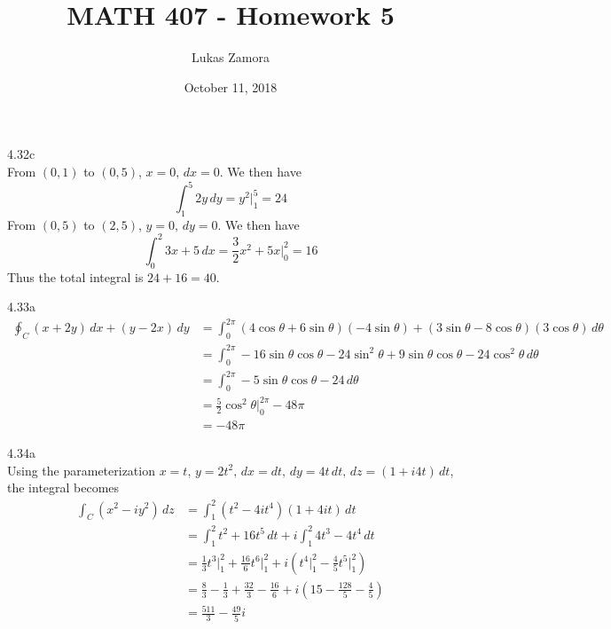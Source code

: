 \documentclass{article}
\title{MATH 407 - Homework 5}
\author{Lukas Zamora}
\date{October 11, 2018}
\theoremstyle{definition}
\begin{document}
    \maketitle
    
    \begin{prob}{4.32c} $  $ \vspace{2mm} \\ 
    	From $ (0,1) $ to $ (0,5) $, $ x=0, \, dx=0 $. We then have
    	\[
    		\int_{1}^{5} 2y \, dy = y^2 \Big|_{1}^{5} = 24
    	\]
    	From $ (0,5) $ to $ (2,5) $, $ y = 0, \, dy = 0 $. We then have
    	\[
    		\int_{0}^{2} 3x + 5 \, dx = \frac{3}{2}x^2 + 5x \Big|_{0}^{2} = 16 
    	\]
    	Thus the total integral is $ 24+16= \boxed{40} $.
    \end{prob}

	\begin{prob}{4.33a} $  $
		\begin{align*}
			\oint_C (x+2y)\,dx + (y-2x)\,dy &= \int_{0}^{2\pi} (4\cos\theta + 6\sin\theta)(-4\sin\theta) + (3\sin\theta - 8\cos\theta)(3\cos\theta) \, d\theta \\
			&= \int_{0}^{2\pi} -16\sin\theta\cos\theta - 24\sin^2\theta + 9\sin\theta\cos\theta - 24\cos^2\theta \, d\theta \\
			&= \int_{0}^{2\pi} -5\sin\theta\cos\theta - 24 \, d\theta \\
			&= \frac{5}{2}\cos^2\theta \Big|_{0}^{2\pi} - 48\pi \\
			&= \boxed{-48\pi}
		\end{align*}
	\end{prob}

	\begin{prob}{4.34a} $  $ \vspace{2mm} \\
		Using the parameterization $ x=t, \, y=2t^2, \, dx = dt, \, dy = 4t \, dt, \, dz = (1+i4t)\,dt $, the integral becomes
		\begin{align*}
			\int_C (x^2-iy^2)\,dz &= \int_{1}^{2} (t^2-4it^4)(1+4it)\,dt \\
			&= \int_{1}^{2} t^2 + 16t^5 \, dt + i \int_{1}^{2} 4t^3 - 4t^4 \, dt \\
			&= \frac{1}{3}t^3 \Big|_{1}^{2} + \frac{16}{6} t^6 \Big|_{1}^{2} + i \left( t^4 \Big|_{1}^{2} - \frac{4}{5}t^5 \Big|_{1}^{2} \right) \\
			&= \frac{8}{3} - \frac{1}{3} + \frac{32}{3} - \frac{16}{6} + i \left( 15 - \frac{128}{5} - \frac{4}{5} \right) \\
			&= \boxed{\frac{511}{3} - \frac{49}{5}i}
		\end{align*}
	\end{prob}
\end{document}
